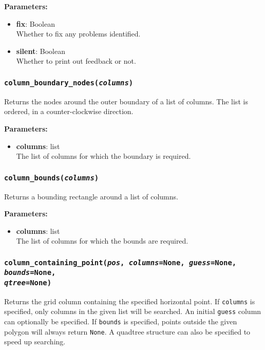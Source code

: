 \textbf{Parameters:}
\begin{itemize}
\item \textbf{fix}: Boolean\\
  Whether to fix any problems identified.
\item \textbf{silent}: Boolean\\
  Whether to print out feedback or not.
\end{itemize}

\subsubsection{\texttt{column\_boundary\_nodes(\emph{columns})}}
\label{sec:column_boundary_nodes}

Returns the nodes around the outer boundary of a list of columns.  The list is ordered, in a counter-clockwise direction.

\textbf{Parameters:}
\begin{itemize}
\item \textbf{columns}: list\\
  The list of columns for which the boundary is required.
\end{itemize}

\subsubsection{\texttt{column\_bounds(\emph{columns})}}
\label{sec:column_bounds}

Returns a bounding rectangle around a list of columns.

\textbf{Parameters:}
\begin{itemize}
\item \textbf{columns}: list\\
  The list of columns for which the bounds are required.
\end{itemize}

\subsubsection{\texttt{column\_containing\_point(\emph{pos}, \emph{columns}=None, \emph{guess}=None, \emph{bounds}=None,\\
\emph{qtree}=None)}}
\label{sec:column_containing_point}

Returns the grid column containing the specified horizontal point.  If \texttt{columns} is specified, only columns in the given list will be searched.  An initial \texttt{guess} column can optionally be specified.  If \texttt{bounds} is specified, points outside the given polygon will always return \texttt{None}.  A quadtree structure can also be specified to speed up searching.

